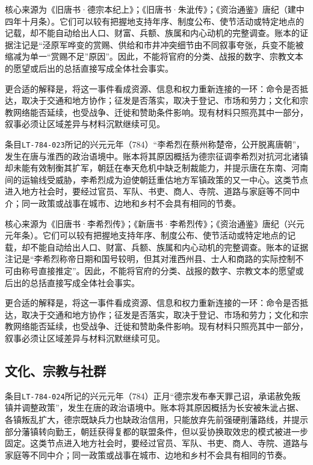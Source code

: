核心来源为《旧唐书·德宗本纪上》；《旧唐书·朱泚传》；《资治通鉴》唐纪（建中四年十月条）。它们可以较有把握地支持年序、制度公布、使节活动或特定地点的记载，却不能自动给出人口、财富、兵额、族属和内心动机的完整调查。账本的证据注记是“泾原军哗变的赏赐、供给和市井冲突细节由不同叙事夸张，兵变不能被缩减为单一“赏赐不足”原因”。因此，不能将官府的分类、战报的数字、宗教文本的愿望或后出的总括直接写成全体社会事实。

更合适的解释是，将这一事件看成资源、信息和权力重新连接的一环：命令是否抵达，取决于交通和地方协作；征发是否落实，取决于登记、市场和劳力；文化和宗教网络能否延续，也受战争、迁徙和赞助条件影响。现有材料只照亮其中一部分，叙事必须让区域差异与材料沉默继续可见。

条目\texttt{LT-784-023}所记的兴元元年（784）“李希烈在蔡州称楚帝，公开脱离唐朝”，发生在唐与淮西的政治语境中。账本将其原因概括为德宗征调李希烈对抗河北诸镇却未能有效制衡其扩军，朝廷在奉天危机中缺乏制裁能力，并提示唐在东南、河南间的运输线受威胁，李希烈成为迫使朝廷重估地方军镇政策的又一中心。这类节点进入地方社会时，要经过官员、军队、书吏、商人、寺院、道路与家庭等不同中介；同一政策或战事在城市、边地和乡村不会具有相同的节奏。

核心来源为《旧唐书·李希烈传》；《新唐书·李希烈传》；《资治通鉴》唐纪（兴元元年条）。它们可以较有把握地支持年序、制度公布、使节活动或特定地点的记载，却不能自动给出人口、财富、兵额、族属和内心动机的完整调查。账本的证据注记是“李希烈称帝日期和国号较明，但其对淮西州县、士人和商路的实际控制不可由称号直接推定”。因此，不能将官府的分类、战报的数字、宗教文本的愿望或后出的总括直接写成全体社会事实。

更合适的解释是，将这一事件看成资源、信息和权力重新连接的一环：命令是否抵达，取决于交通和地方协作；征发是否落实，取决于登记、市场和劳力；文化和宗教网络能否延续，也受战争、迁徙和赞助条件影响。现有材料只照亮其中一部分，叙事必须让区域差异与材料沉默继续可见。

\subsection{文化、宗教与社群}

条目\texttt{LT-784-024}所记的兴元元年（784）正月“德宗发布奉天罪己诏，承诺赦免叛镇并调整政策”，发生在唐的政治语境中。账本将其原因概括为长安被朱泚占据、各镇叛乱扩大，德宗既缺兵力也缺政治信用，只能放弃先前强硬削藩路线，并提示部分藩镇转向勤王，朝廷获得复都的联盟条件，但以妥协换取效忠的模式被进一步固定。这类节点进入地方社会时，要经过官员、军队、书吏、商人、寺院、道路与家庭等不同中介；同一政策或战事在城市、边地和乡村不会具有相同的节奏。

